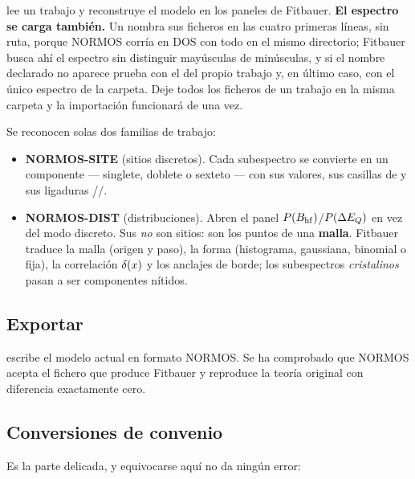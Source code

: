  lee un trabajo y
reconstruye el modelo en los paneles de Fitbauer. \textbf{El espectro se carga
también.} Un  nombra sus ficheros en las cuatro primeras líneas, sin
ruta, porque NORMOS corría en DOS con todo en el mismo directorio; Fitbauer
busca ahí el espectro sin distinguir mayúsculas de minúsculas, y si el nombre
declarado no aparece prueba con el del propio trabajo y, en último caso, con el
único espectro de la carpeta. Deje todos los ficheros de un trabajo en la misma
carpeta y la importación funcionará de una vez.

Se reconocen solas dos familias de trabajo:

\begin{itemize}[nosep]
  \item \textbf{NORMOS-SITE} (sitios discretos). Cada subespectro se convierte en
        un componente --- singlete, doblete o sexteto --- con sus valores, sus
        casillas de  y sus ligaduras
        //.
  \item \textbf{NORMOS-DIST} (distribuciones). Abren el panel
        $P(B_{\mathrm{hf}})$/$P(\Delta E_{Q})$ en vez del modo discreto. Sus 
        \emph{no} son sitios: son los puntos de una \textbf{malla}. Fitbauer
        traduce la malla (origen y paso), la forma (histograma, gaussiana,
        binomial o fija), la correlación $\delta(x)$ y los anclajes de borde; los
        subespectros \emph{cristalinos} pasan a ser componentes nítidos.
\end{itemize}

\subsection*{Exportar}

 escribe el modelo
actual en formato NORMOS. Se ha comprobado que NORMOS acepta el fichero que
produce Fitbauer y reproduce la teoría original con diferencia exactamente cero.

\subsection*{Conversiones de convenio}

Es la parte delicada, y equivocarse aquí no da ningún error:

